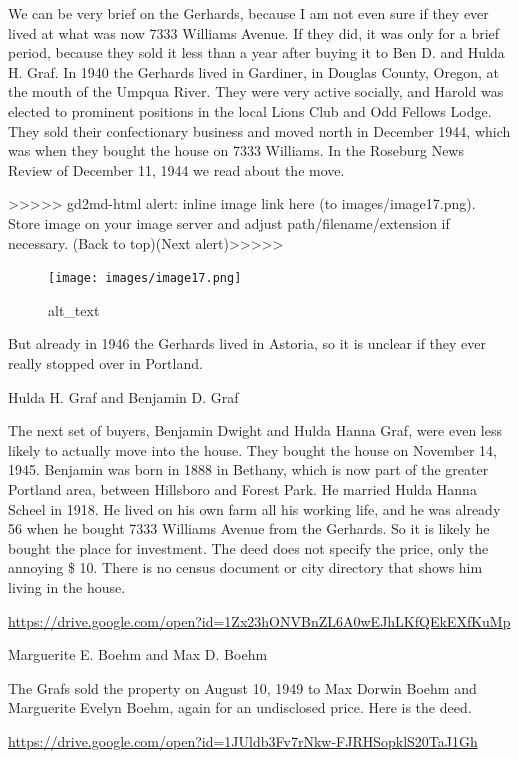 \documentclass[
  12pt,
]{book}
\begin{document}
We can be very brief on the Gerhards, because I am not even sure if they ever lived at what was now 7333 Williams Avenue. If they did, it was only for a brief period, because they sold it less than a year after buying it to Ben D. and Hulda H. Graf. In 1940 the Gerhards lived in Gardiner, in Douglas County, Oregon, at the mouth of the Umpqua River. They were very active socially, and Harold was elected to prominent positions in the local Lions Club and Odd Fellows Lodge. They sold their confectionary business and moved north in December 1944, which was when they bought the house on 7333 Williams. In the Roseburg News Review of December 11, 1944 we read about the move.

{\textgreater\textgreater\textgreater\textgreater\textgreater{} gd2md-html alert: inline image link here (to images/image17.png). Store image on your image server and adjust path/filename/extension if necessary. }(Back to top)(Next alert){\textgreater\textgreater\textgreater\textgreater\textgreater{} }

\begin{figure}
\centering
\texttt{[image: images/image17.png]}
\caption{alt\_text}
\end{figure}

But already in 1946 the Gerhards lived in Astoria, so it is unclear if they ever really stopped over in Portland.

Hulda H. Graf and Benjamin D. Graf

The next set of buyers, Benjamin Dwight and Hulda Hanna Graf, were even less likely to actually move into the house. They bought the house on November 14, 1945. Benjamin was born in 1888 in Bethany, which is now part of the greater Portland area, between Hillsboro and Forest Park. He married Hulda Hanna Scheel in 1918. He lived on his own farm all his working life, and he was already 56 when he bought 7333 Williams Avenue from the Gerhards. So it is likely he bought the place for investment. The deed does not specify the price, only the annoying \$ 10. There is no census document or city directory that shows him living in the house.

\url{https://drive.google.com/open?id=1Zx23hONVBnZL6A0wEJhLKfQEkEXfKuMp}

Marguerite E. Boehm and Max D. Boehm

The Grafs sold the property on August 10, 1949 to Max Dorwin Boehm and Marguerite Evelyn Boehm, again for an undisclosed price. Here is the deed.

\url{https://drive.google.com/open?id=1JUldb3Fv7rNkw-FJRHSopklS20TaJ1Gh}
\end{document}
